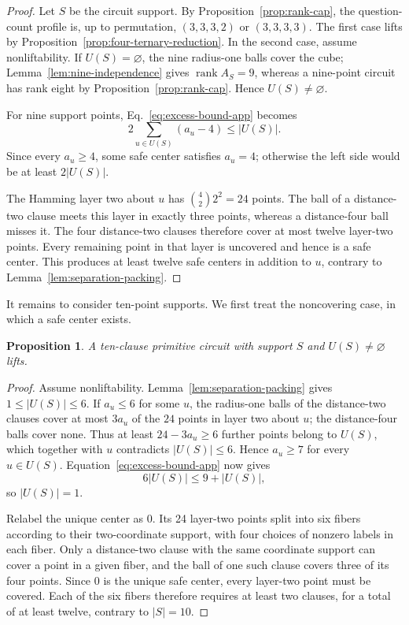 \documentclass[11pt]{article}
\newtheorem{proposition}[theorem]{Proposition}
\theoremstyle{definition}
\theoremstyle{remark}
\newcommand{\rank}{\operatorname{rank}}
\newcommand{\card}[1]{\lvert #1\rvert}
\numberwithin{equation}{section}
\begin{document}
\begin{proof}
Let \(S\) be the circuit support.
By Proposition~\ref{prop:rank-cap}, the question-count profile is, up to
permutation, \((3,3,3,2)\) or \((3,3,3,3)\).  The first case lifts by
Proposition~\ref{prop:four-ternary-reduction}.  In the second case, assume
nonliftability.  If \(U(S)=\varnothing\), the nine radius-one balls cover the
cube; Lemma~\ref{lem:nine-independence} gives \(\rank A_S=9\), whereas a
nine-point circuit has rank eight by Proposition~\ref{prop:rank-cap}.  Hence
\(U(S)\neq\varnothing\).

For nine support points, Eq.~\eqref{eq:excess-bound-app} becomes
\[
  2\sum_{u\in U(S)}(a_u-4)\leq\card{U(S)}.
\]
Since every \(a_u\geq4\), some safe center satisfies \(a_u=4\); otherwise the
left side would be at least \(2\card{U(S)}\).

The Hamming layer two about \(u\) has
\(\binom42 2^2=24\) points.  The ball of a distance-two clause meets this
layer in exactly three points, whereas a distance-four ball misses it.
The four distance-two clauses therefore cover at most twelve layer-two
points.  Every remaining point in that layer is uncovered and hence is a safe
center.  This produces at least twelve safe centers in addition to \(u\),
contrary to Lemma~\ref{lem:separation-packing}.
\end{proof}

It remains to consider ten-point supports.  We first treat the noncovering
case, in which a safe center exists.

\begin{proposition}
\label{prop:ten-noncover}
A ten-clause primitive circuit with support \(S\) and
\(U(S)\neq\varnothing\) lifts.
\end{proposition}

\begin{proof}
Assume nonliftability.  Lemma~\ref{lem:separation-packing} gives
\(1\leq\card{U(S)}\leq6\).  If \(a_u\leq6\) for some \(u\), the radius-one
balls of the distance-two clauses cover at most \(3a_u\) of the \(24\) points in layer
two about \(u\); the distance-four balls cover none.  Thus at least
\(24-3a_u\geq6\) further points belong to \(U(S)\), which together with \(u\)
contradicts \(\card{U(S)}\leq6\).  Hence \(a_u\geq7\) for every \(u\in U(S)\).
Equation~\eqref{eq:excess-bound-app} now gives
\[
  6\card{U(S)}\leq9+\card{U(S)},
\]
so \(\card{U(S)}=1\).

Relabel the unique center as \(0\).  Its 24 layer-two points split into six
fibers according to their two-coordinate support, with four choices of
nonzero labels in each fiber.  Only a distance-two clause with the same
coordinate support can cover a point in a given fiber, and the ball of one
such clause covers three of its four points.  Since \(0\) is the unique safe
center, every layer-two point must be covered.  Each of the six fibers
therefore requires at least two clauses, for a total of at least twelve,
contrary to \(\card S=10\).
\end{proof}
\end{document}
